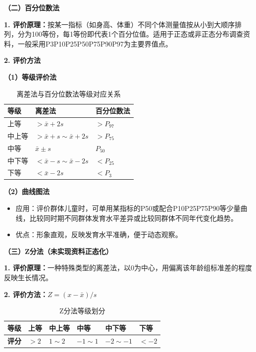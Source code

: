 \begin{keybox}
\textbf{（二）百分位数法}

\textbf{1. 评价原理：}按某一指标（如身高、体重）不同个体测量值按从小到大顺序排列，分为100等份，每1等份即代表1个百分位值。适用于正态或非正态分布调查资料，一般采用P3P10P25P50P75P90P97为主要界值点。

\textbf{2. 评价方法}

\textbf{（1）等级评价法}

\begin{table}[H]
\centering
\caption{离差法与百分位数法等级对应关系}
\begin{tabularx}{\textwidth}{lll}
\hline
\textbf{等级} & \textbf{离差法} & \textbf{百分位数法} \\
\hline
上等   & $>\bar{x}+2s$     & $>P_{97}$ \\
中上等 & $>\bar{x}+s\sim\bar{x}+2s$ & $>P_{75}$ \\
中等   & $\bar{x}\pm s$           & $P_{50}$ \\
中下等 & $<\bar{x}-s\sim\bar{x}-2s$ & $<P_{25}$ \\
下等   & $<\bar{x}-2s$     & $<P_3$ \\
\hline
\end{tabularx}
\end{table}

\textbf{（2）曲线图法}

\begin{itemize}[leftmargin=*]
    \item 应用：评价群体儿童时，可单用某指标的P50或配合P10P25P75P90等少量曲线，比较同时期不同群体发育水平差异或比较同群体不同年代变化趋势。
    \item 优点：形象直观，反映发育水平准确，便于动态观察。
\end{itemize}

\textbf{（三）Z分法（未实现资料正态化）}

\textbf{1. 评价原理：}一种特殊类型的离差法，以0为中心，用偏离该年龄组标准差的程度反映生长情况。

\textbf{2. 评价方法：}$Z=(x-\bar{x})/s$

\begin{table}[H]
\centering
\caption{Z分法等级划分}
\begin{tabularx}{\textwidth}{llllll}
\hline
\textbf{等级} & 上等 & 中上等 & 中等 & 中下等 & 下等 \\
\hline
\textbf{评分} & $>2$ & $1\sim2$ & $-1\sim1$ & $-2\sim-1$ & $<-2$ \\
\hline
\end{tabularx}
\end{table}
\end{keybox}

